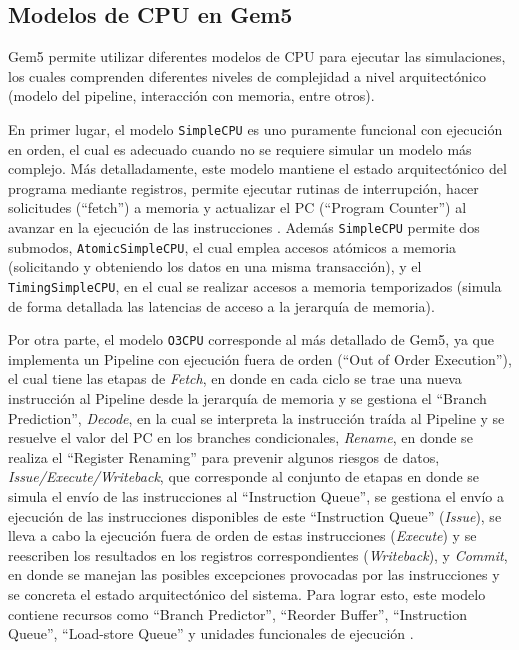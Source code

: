 \documentclass {article}
\begin{document}
\subsection{Modelos de CPU en Gem5}
Gem5 permite utilizar diferentes modelos de CPU para ejecutar las simulaciones, los cuales
comprenden diferentes niveles de complejidad a nivel arquitectónico (modelo del pipeline,
interacción con memoria, entre otros).

En primer lugar, el modelo \texttt{SimpleCPU} es uno puramente funcional con ejecución en orden, el
cual es adecuado cuando no se requiere simular un modelo más complejo. Más detalladamente, este
modelo mantiene el estado arquitectónico del programa mediante registros, permite ejecutar rutinas
de interrupción, hacer solicitudes (``fetch'') a memoria y actualizar el PC (``Program Counter'') al
avanzar en la ejecución de las instrucciones \cite{binkert2017}. Además \texttt{SimpleCPU} permite
dos submodos, \texttt{AtomicSimpleCPU}, el cual emplea accesos atómicos a memoria (solicitando y
obteniendo los datos en una misma transacción), y el \texttt{TimingSimpleCPU}, en el cual se
realizar accesos a memoria temporizados (simula de forma detallada las latencias de acceso a la
jerarquía de memoria).

Por otra parte, el modelo \texttt{O3CPU} corresponde al más detallado de Gem5, ya que implementa un
Pipeline con ejecución fuera de orden (``Out of Order Execution''), el cual tiene las etapas de
\textit{Fetch}, en donde en cada ciclo se trae una nueva instrucción al Pipeline desde la jerarquía
de memoria y se gestiona el ``Branch Prediction'', \textit{Decode}, en la cual se interpreta la
instrucción traída al Pipeline y se resuelve el valor del PC en los branches condicionales,
\textit{Rename}, en donde se realiza el ``Register Renaming'' para prevenir algunos riesgos de
datos, \textit{Issue/Execute/Writeback}, que corresponde al conjunto de etapas en donde se simula el
envío de las instrucciones al ``Instruction Queue'', se gestiona el envío a ejecución de las
instrucciones disponibles de este ``Instruction Queue'' (\textit{Issue}), se lleva a cabo la
ejecución fuera de orden de estas instrucciones (\textit{Execute}) y se reescriben los resultados en
los registros correspondientes (\textit{Writeback}), y \textit{Commit}, en donde se manejan las
posibles excepciones provocadas por las instrucciones y se concreta el estado arquitectónico del
sistema. Para lograr esto, este modelo contiene recursos como ``Branch Predictor'', ``Reorder
Buffer'', ``Instruction Queue'', ``Load-store Queue'' y unidades funcionales de ejecución
\cite{binkert2017}.
\end{document}
